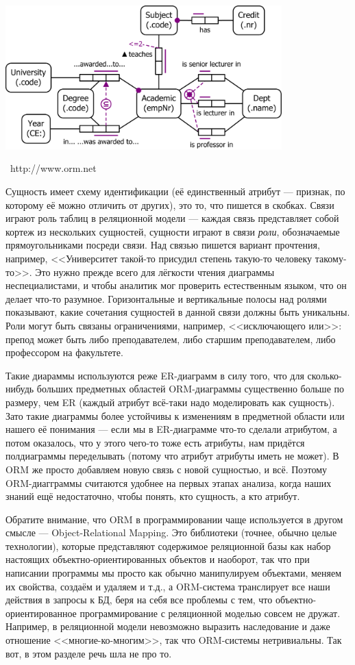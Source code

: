 \documentclass[a5paper]{article}
\newcommand{\attribution}[1] {
    \vspace{-4mm}\begin{flushright}\begin{scriptsize}%
    {\textcopyright\, #1}\end{scriptsize}\end{flushright}
}
\begin{document}
\begin{center}
    \includegraphics[width=0.8\textwidth]{orm.png}
    \attribution{http://www.orm.net}
\end{center}

Сущность имеет схему идентификации (её единственный атрибут --- признак, по которому её можно отличить от других), это то, что пишется в скобках. Связи играют роль таблиц в реляционной модели --- каждая связь представляет собой кортеж из нескольких сущностей, сущности играют в связи \textit{роли}, обозначаемые прямоугольниками посреди связи. Над связью пишется вариант прочтения, например, <<Университет такой-то присудил степень такую-то человеку такому-то>>. Это нужно прежде всего для лёгкости чтения диаграммы неспециалистами, и чтобы аналитик мог проверить естественным языком, что он делает что-то разумное. Горизонтальные и вертикальные полосы над ролями показывают, какие сочетания сущностей в данной связи должны быть уникальны. Роли могут быть связаны ограничениями, например, <<исключающего или>>: препод может быть либо преподавателем, либо старшим преподавателем, либо профессором на факультете.

Такие диараммы используются реже ER-диаграмм в силу того, что для сколько-нибудь больших предметных областей ORM-диаграммы существенно больше по размеру, чем ER (каждый атрибут всё-таки надо моделировать как сущность). Зато такие диаграммы более устойчивы к изменениям в предметной области или нашего её понимания --- если мы в ER-диаграмме что-то сделали атрибутом, а потом оказалось, что у этого чего-то тоже есть атрибуты, нам придётся полдиаграммы переделывать (потому что атрибут атрибуты иметь не может). В ORM же просто добавляем новую связь с новой сущностью, и всё. Поэтому ORM-диагграммы считаются удобнее на первых этапах анализа, когда наших знаний ещё недостаточно, чтобы понять, кто сущность, а кто атрибут.

Обратите внимание, что ORM в программировании чаще используется в другом смысле --- Object-Relational Mapping. Это библиотеки (точнее, обычно целые технологии), которые представляют содержимое реляционной базы как набор настоящих объектно-ориентированных объектов и наоборот, так что при написании программы мы просто как обычно манипулируем объектами, меняем их свойства, создаём и удаляем и т.д., а ORM-система транслирует все наши действия в запросы к БД, беря на себя все проблемы с тем, что объектно-ориентированное программирование с реляционной моделью совсем не дружат. Например, в реляционной модели невозможно выразить наследование и даже отношение <<многие-ко-многим>>, так что ORM-системы нетривиальны. Так вот, в этом разделе речь шла не про то.
\end{document}
